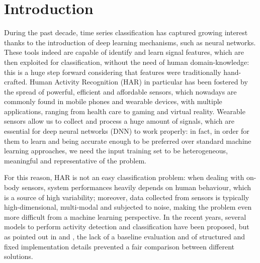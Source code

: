 
\section{Introduction}
\label{sec:introduction}

During the past decade, time series classification has captured growing interest thanks to the introduction of deep learning mechanisms, such as neural networks. These tools indeed are capable of identify and learn signal features, which are then exploited for classification, without the need of human domain-knowledge: this is a huge step forward considering that features were traditionally hand-crafted.
Human Activity Recognition (HAR) in particular has been fostered by the spread of powerful, efficient and affordable sensors, which nowadays are commonly found in mobile phones and wearable devices, with multiple applications, ranging from health care to gaming and virtual reality. \cite{HAR-2013}
Wearable sensors allow us to collect and process a huge amount of signals, which are essential for deep neural networks (DNN) to work properly: in fact, in order for them to learn and being accurate enough to be preferred over standard machine learning approaches, we need the input training set to be heterogeneous, meaningful and representative of the problem.

For this reason, HAR is not an easy classification problem: when dealing with on-body sensors, system performances heavily depends on human behaviour, which is a source of high variability; moreover, data collected from sensors is typically high-dimensional, multi-modal and subjected to noise, making the problem even more difficult from a machine learning perspective. 
In the recent years, several models to perform activity detection and classification have been proposed, but as pointed out in \cite{Chavarriaga2013} and \cite{HAR-COMP2018}, the lack of a baseline evaluation and of structured and fixed implementation details prevented a fair comparison between different solutions.


